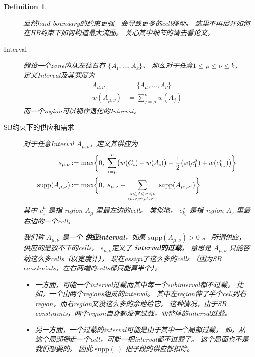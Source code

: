 \documentclass[UTF8,a4paper]{ctexart}
\renewcommand{\emph}[1]{\textbf{#1}}
\renewcommand{\leq}{\leqslant}
\newcommand{\supp}[1]{\text{supp} ({#1})}
\renewcommand{\atop}[2]{\genfrac{}{}{0pt}{}{#1}{#2}}
\newtheorem{definition}{Definition}
\begin{document}
\begin{definition}
\begin{description}
        \begin{noteblock}
            显然hard boundary的约束更强，会导致更多的cell移动。
            这里不再展开如何在HB约束下如何构造最大流图。
            关心其中细节的请去看论文。
        \end{noteblock}
    \item[Interval]
        假设一个zone内从左往右有 $\{A_1,\dots,A_k\}$。
        那么对于任意$1\leq \mu \leq \nu \leq k$，
        定义Interval及其宽度为
        \begin{align*}
            A_{\mu,\nu} &=\{A_\mu,\dots,A_\nu\}\\
            w(A_{\mu,\nu}) &=\sum_{j=\mu}^{\nu} w(A_j)
        \end{align*}
        而一个region可以视作退化的Interval。
    \item[SB约束下的供应和需求]
        对于任意Interval $A_{\mu,\nu}$，定义其供应为
        \begin{align*}
            s_{\mu,\nu} &:=\max\biggl\{%
                0,\;%
                \sum_{i=\mu}^{\nu}\bigl(w(C_i)-w(A_i)\bigr)%
                -\frac{1}{2}\bigl(w(c^{\mu}_1)+w(c^{\nu}_{k_\nu})\bigr)%
            \biggl\}
            \\
            \supp{A_{\mu,\nu}} &:=\max\biggl\{%
                0,\;%
                s_{\mu,\nu}%
                -\sum_{\atop{\mu\leq\mu'\leq\nu'\leq\nu}{(\mu,\nu)\neq(\mu',\nu')}}\supp{A_{\mu',\nu'}}%
            \biggr\}
        \end{align*}
        其中 $c^\mu_1$ 是指 region $A_\mu$ 里最左边的cell。
        类似地， $c^\nu_{k_\nu}$ 是指 region $A_{\nu}$ 里最右边的一个cell。
    
        我们称 $A_{\mu,\nu}$ 是一个 \emph{供应interval}，如果 $\supp{A_{\mu,\nu}}>0$ 。
        所谓供应，供应的是放不下的cells。
        $s_{\mu,\nu}$定义了 \emph{interval的过载}，
        意思是 $A_{\mu,\nu}$ 只能容纳这么多cells（以宽度计），
        现在assign了这么多的cells
        （因为SB constraints，左右两端的cells都只能算半个）。
        \begin{itemize}
        \item 一方面，可能一个interval过载而其中每一个subinterval都不过载。
            比如，一个由两个regions组成的interval。
            其中左region伸了半个cell到右region，而右region又没这么多的余地给它。
            这种情况，由于SB constraints，两个region自身都没有过载，而整体的interval过载。
        \item 另一方面，一个过载的interval可能是由于其中一个局部过载，
            即，从这个局部挪走一个cell，可能一把interval都不过载了。
            这个局面也不是我们想要的。
            因此 $\supp{\cdot}$ 把子段的供应都扣除。
        \end{itemize}
        

\end{description}
\end{definition}
\end{document}
